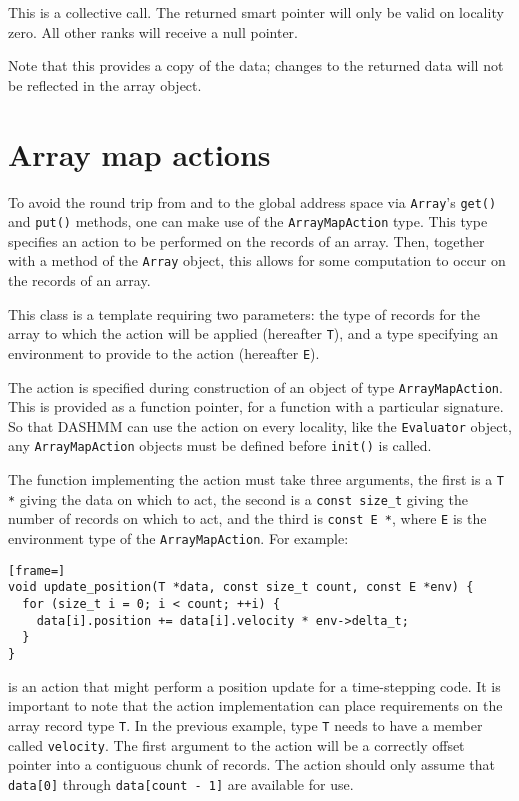 This is a collective call. The returned smart pointer will only be valid on
locality zero. All other ranks will receive a null pointer.

Note that this provides a copy of the data; changes to the returned data will
not be reflected in the array object.

\section{Array map actions}

To avoid the round trip from and to the global address space via
\texttt{Array}'s \texttt{get()} and \texttt{put()} methods, one can make use
of the \texttt{ArrayMapAction} type. This type specifies an action to be
performed on the records of an array. Then, together with a method of the
\texttt{Array} object, this allows for some computation to occur on the
records of an array.

This class is a template requiring two parameters: the type of records for
the array to which the action will be applied (hereafter \texttt{T}), and a
type specifying an environment to provide to the action (hereafter \texttt{E}).

The action is specified during construction of an object of type
\texttt{ArrayMapAction}. This is provided as a function pointer, for a function
with a particular signature. So that DASHMM can use the action on every
locality, like the \texttt{Evaluator} object, any \texttt{ArrayMapAction}
objects must be defined before \texttt{init()} is called.

The function implementing the action must take three arguments, the first is
a \texttt{T *} giving the data on which to act, the second is a
\texttt{const size\_t} giving the number of records on which to act, and the
third is \texttt{const E *}, where \texttt{E} is the environment type of the
\texttt{ArrayMapAction}. For example:

\begin{lstlisting}[frame=]
void update_position(T *data, const size_t count, const E *env) {
  for (size_t i = 0; i < count; ++i) {
    data[i].position += data[i].velocity * env->delta_t;
  }
}
\end{lstlisting}

\noindent is an action that might perform a position update for a
time-stepping code. It is important to note that the action implementation can
place requirements on the array record type \texttt{T}. In the previous
example, type \texttt{T} needs to have a member called \texttt{velocity}.
The first argument to the action will be a correctly offset pointer into a
contiguous chunk of records. The action should only assume that
\texttt{data[0]} through \texttt{data[count - 1]} are available for use.

